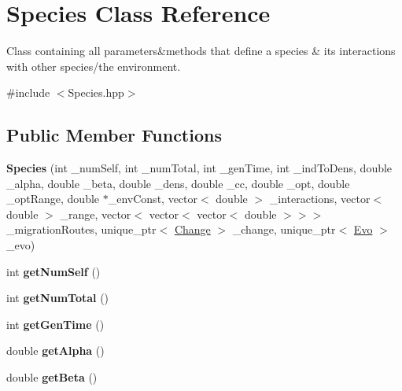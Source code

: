 \hypertarget{classSpecies}{}\section{Species Class Reference}
\label{classSpecies}


Class containing all parameters\&methods that define a species \& it\textquotesingle{}s interactions with other species/the environment.  




{\ttfamily \#include $<$Species.\+hpp$>$}

\subsection*{Public Member Functions}
\begin{DoxyCompactItemize}
\item 
\mbox{\label{classSpecies_a385a49104d5d6d6aee34a983e589832b}} 
{\bfseries Species} (int \+\_\+num\+Self, int \+\_\+num\+Total, int \+\_\+gen\+Time, int \+\_\+ind\+To\+Dens, double \+\_\+alpha, double \+\_\+beta, double \+\_\+dens, double \+\_\+cc, double \+\_\+opt, double \+\_\+opt\+Range, double $\ast$\+\_\+env\+Const, vector$<$ double $>$ \+\_\+interactions, vector$<$ double $>$ \+\_\+range, vector$<$ vector$<$ vector$<$ double $>$$>$$>$ \+\_\+migration\+Routes, unique\+\_\+ptr$<$ \hyperlink{classChange}{Change} $>$ \+\_\+change, unique\+\_\+ptr$<$ \hyperlink{classEvo}{Evo} $>$ \+\_\+evo)
\item 
\mbox{\label{classSpecies_acdddfb4cb6f496fee642b7c58f39d3f1}} 
int {\bfseries get\+Num\+Self} ()
\item 
\mbox{\label{classSpecies_a31566bcf2f8647e9498ee2fec28531fb}} 
int {\bfseries get\+Num\+Total} ()
\item 
\mbox{\label{classSpecies_af15e54343492700ff8841c3563bd9a0c}} 
int {\bfseries get\+Gen\+Time} ()
\item 
\mbox{\label{classSpecies_a9951ad56ce265722c633b461f00bbb66}} 
double {\bfseries get\+Alpha} ()
\item 
\mbox{\label{classSpecies_ae7a743e1bd001b01d17384763cdfbdee}} 
double {\bfseries get\+Beta} ()

\end{DoxyCompactItemize}
